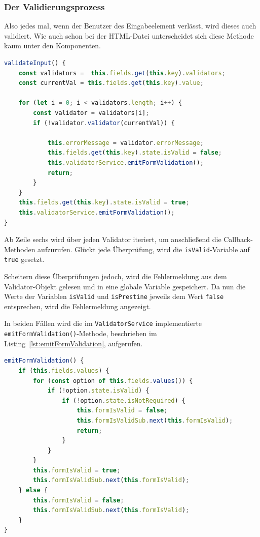 \subsubsection{Der Validierungsprozess}

Also jedes mal, wenn der Benutzer des Eingabeelement verlässt, wird dieses auch validiert. Wie auch schon bei der HTML-Datei unterscheidet sich diese Methode kaum unter den Komponenten.

\begin{lstlisting}[caption={Die Validierung innerhalb Komponenten}, language=JavaScript,label={lst:validateInput}]
validateInput() {
	const validators =  this.fields.get(this.key).validators;
	const currentVal = this.fields.get(this.key).value;
	
	for (let i = 0; i < validators.length; i++) {
		const validator = validators[i];
		if (!validator.validator(currentVal)) {
			
			this.errorMessage = validator.errorMessage;
			this.fields.get(this.key).state.isValid = false;
			this.validatorService.emitFormValidation();
			return;
		}
	}
	this.fields.get(this.key).state.isValid = true;
	this.validatorService.emitFormValidation();
}
\end{lstlisting}

Ab Zeile sechs wird über jeden Validator iteriert, um anschließend die Callback-Methoden aufzurufen. Glückt jede Überprüfung, wird die \texttt{isValid}-Variable auf \texttt{true} gesetzt. 

Scheitern diese Überprüfungen jedoch, wird die Fehlermeldung aus dem Validator-Objekt gelesen und in eine globale Variable gespeichert. Da nun die Werte der Variablen \texttt{isValid} und \texttt{isPrestine} jeweils dem Wert \texttt{false} entsprechen, wird die Fehlermeldung angezeigt. 

In beiden Fällen wird die im \texttt{ValidatorService} implementierte \texttt{emitFormValidation()}-Methode, beschrieben im Listing~\ref{lst:emitFormValidation}, aufgerufen.

\begin{lstlisting}[caption={Die Validierung aller Komponenten im \texttt{ValidatorService}}, language=JavaScript,label={lst:emitFormValidation}]
emitFormValidation() {
	if (this.fields.values) {
		for (const option of this.fields.values()) {
			if (!option.state.isValid) {
				if (!option.state.isNotRequired) {
					this.formIsValid = false;
					this.formIsValidSub.next(this.formIsValid);
					return;
				}
			}
		}
		this.formIsValid = true;
		this.formIsValidSub.next(this.formIsValid);
	} else {
		this.formIsValid = false;
		this.formIsValidSub.next(this.formIsValid);
	}
}
\end{lstlisting}

